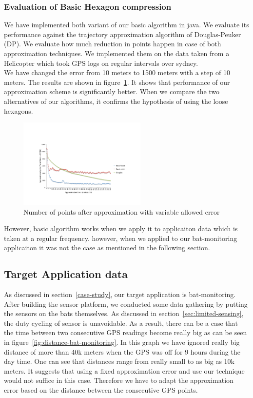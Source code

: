 \documentclass[conference]{IEEEtran}
\begin{document}
\subsubsection{Evaluation of Basic Hexagon compression}
We have implemented both variant of our basic algorithm in java. We evaluate its performance against the trajectory approximation algorithm of Douglas-Peuker (DP). We evaluate how much reduction in points happen in case of both approximation techniques. We implemented them on the data taken from a Helicopter which took GPS logs on regular intervals over sydney.\\
We have changed the error from 10 meters to 1500 meters with a step of 10 meters. The results are shown in figure~\ref{fig:performance-graph}. It shows that performance of our approximation scheme is significantly better. When we compare the two alternatives of our algorithms, it confirms the hypothesis of using the loose hexagons.
\begin{figure}[ht]
  \centering
  \includegraphics[width=2.5in]{images/basic-points.pdf}
  \caption {Number of points after approximation with variable allowed error}
  \label{fig:performance-graph}
\end{figure}

However, basic algorithm works when we apply it to applicaiton data which is taken at a regular frequency. however, when we applied to our bat-monitoring applicaiton it was not the case as mentioned in the following section.

\subsection{Target Application data}
As discussed in section~\ref{case-study}, our target application is bat-monitoring. After building the sensor platform, we conducted some data gathering by putting the sensors on the bats themselves. As discussed in section~\ref{sec:limited-sensing}, the duty cycling of sensor is unavoidable. As a result, there can be a case that the time between two consecutive GPS readings become really big as can be seen in figure~\ref{fig:distance-bat-monitoring}. In this graph we have ignored really big distance of more than 40k meters when the GPS was off for 9 hours during the day time. One can see that distances range from really small to as big as 10k meters. It suggests that using a fixed approximation error and use our technique would not suffice in this case. Therefore we have to adapt the approximation error based on the distance between the consecutive GPS points.
\end{document}
